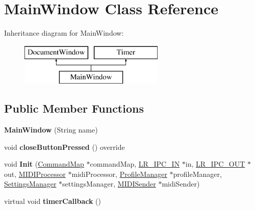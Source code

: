 \hypertarget{class_main_window}{}\section{Main\+Window Class Reference}
\label{class_main_window}
Inheritance diagram for Main\+Window\+:\begin{figure}[H]
\begin{center}
\leavevmode
\includegraphics[height=2.000000cm]{class_main_window}
\end{center}
\end{figure}
\subsection*{Public Member Functions}
\begin{DoxyCompactItemize}
\item 
{\bfseries Main\+Window} (String name)\hypertarget{class_main_window_a6ef7a51f3acb124271f11eecb6df7a07}{}\label{class_main_window_a6ef7a51f3acb124271f11eecb6df7a07}

\item 
void {\bfseries close\+Button\+Pressed} () override\hypertarget{class_main_window_a50d2e609ff67f40e10806605f8281bc4}{}\label{class_main_window_a50d2e609ff67f40e10806605f8281bc4}

\item 
void {\bfseries Init} (\hyperlink{class_command_map}{Command\+Map} $\ast$command\+Map, \hyperlink{class_l_r___i_p_c___i_n}{L\+R\+\_\+\+I\+P\+C\+\_\+\+IN} $\ast$in, \hyperlink{class_l_r___i_p_c___o_u_t}{L\+R\+\_\+\+I\+P\+C\+\_\+\+O\+UT} $\ast$out, \hyperlink{class_m_i_d_i_processor}{M\+I\+D\+I\+Processor} $\ast$midi\+Processor, \hyperlink{class_profile_manager}{Profile\+Manager} $\ast$profile\+Manager, \hyperlink{class_settings_manager}{Settings\+Manager} $\ast$settings\+Manager, \hyperlink{class_m_i_d_i_sender}{M\+I\+D\+I\+Sender} $\ast$midi\+Sender)\hypertarget{class_main_window_aeaffcd2208ac76f68e8b9b2c76a95e1d}{}\label{class_main_window_aeaffcd2208ac76f68e8b9b2c76a95e1d}

\item 
virtual void {\bfseries timer\+Callback} ()\hypertarget{class_main_window_adc87d108fe34a3c4ca0a021a21bd2ac0}{}\label{class_main_window_adc87d108fe34a3c4ca0a021a21bd2ac0}

\end{DoxyCompactItemize}


